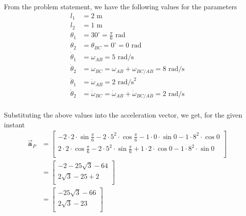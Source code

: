 From the problem statement, we have the following values for the parameters
\[
    \begin{aligned}
        l_1           & = 2\text{ m}                                                              \\
        l_2           & = 1\text{ m}                                                              \\
        \theta_1      & = 30^\circ = \frac{\pi}{6}\text{ rad}                                     \\
        \theta_2      & = \theta_{BC} = 0^\circ = 0\text{ rad}                                    \\
        \dot\theta_1  & = \omega_{AB} = 5\text{ rad/s}                                            \\
        \dot\theta_2  & = \omega_{BC} = \omega_{AB} + \omega_{BC/AB} = 8\text{ rad/s}             \\
        \ddot\theta_1 & = \dot\omega_{AB} = 2\text{ rad/s}^2                                      \\
        \ddot\theta_2 & = \dot\omega_{BC} = \dot\omega_{AB} + \dot\omega_{BC/AB} = 2\text{ rad/s} \\
    \end{aligned}
\]

Substituting the above values into the acceleration vector, we get, for the given instant
\begin{align*}
    \vec{\mathbf{a}}_P
     & =
    \begin{bmatrix}
        -2 \cdot 2 \cdot \sin\frac{\pi}{6} - 2 \cdot 5^2 \cdot \cos\frac{\pi}{6} - 1 \cdot 0 \cdot \sin 0 - 1 \cdot 8^2 \cdot \cos 0 \\
        2 \cdot 2 \cdot \cos\frac{\pi}{6} - 2 \cdot 5^2 \cdot \sin\frac{\pi}{6} + 1 \cdot 2 \cdot \cos 0 - 1 \cdot 8^2 \cdot \sin 0  \\
    \end{bmatrix} \\
     & =
    \begin{bmatrix}
        -2 - 25\sqrt{3} - 64 \\
        2\sqrt{3} - 25 + 2   \\
    \end{bmatrix}                                                                                                         \\
     & =
    \begin{bmatrix}
        - 25\sqrt{3} - 66 \\
        2\sqrt{3} - 23    \\
    \end{bmatrix}                                                                                                            \\
\end{align*}

